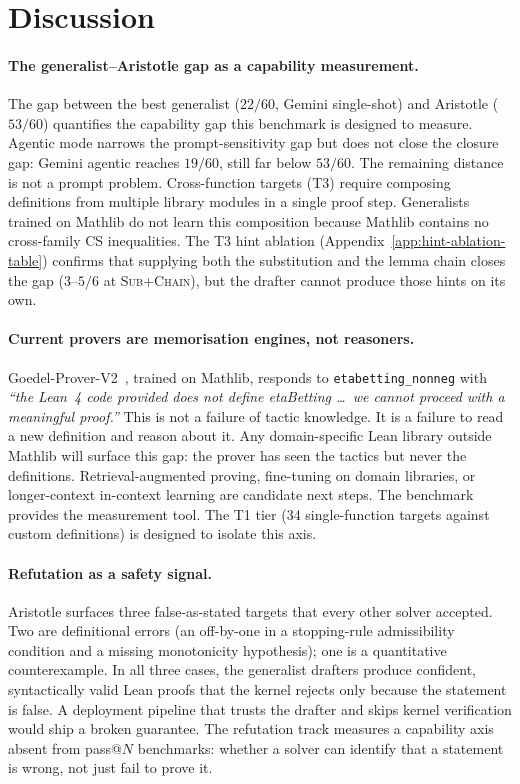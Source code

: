 \section{Discussion}
\label{sec:discussion}

\paragraph{The generalist--Aristotle gap as a capability measurement.}
The gap between the best generalist ($22/60$, Gemini single-shot)
and Aristotle ($53/60$) quantifies the capability gap this benchmark
is designed to measure. Agentic mode narrows the prompt-sensitivity gap but does
not close the closure gap: Gemini agentic reaches $19/60$, still
far below $53/60$. The remaining distance is not a prompt problem.
Cross-function targets (T3) require composing definitions from
multiple library modules in a single proof step. Generalists
trained on Mathlib do not learn this composition because Mathlib
contains no cross-family CS inequalities. The T3 hint ablation
(Appendix~\ref{app:hint-ablation-table}) confirms that supplying
both the substitution and the lemma chain closes the gap
($3$--$5/6$ at \textsc{Sub+Chain}), but the drafter cannot
produce those hints on its own.

\paragraph{Current provers are memorisation engines, not reasoners.}
Goedel-Prover-V2~\cite{goedelprover2025}, trained on Mathlib,
responds to \texttt{etabetting\_nonneg} with \emph{``the Lean~4
code provided does not define etaBetting \ldots\ we cannot proceed
with a meaningful proof.''} This is not a failure of tactic
knowledge. It is a failure to read a new definition and reason
about it. Any domain-specific Lean library outside Mathlib will
surface this gap: the prover has seen the tactics but never the
definitions. Retrieval-augmented proving, fine-tuning on
domain libraries, or longer-context in-context learning are
candidate next steps. The benchmark provides the measurement
tool. The T1 tier ($34$ single-function targets against custom
definitions) is designed to isolate this axis.

\paragraph{Refutation as a safety signal.}
Aristotle surfaces three false-as-stated targets that every other
solver accepted. Two are definitional errors (an off-by-one in a
stopping-rule admissibility condition and a missing monotonicity
hypothesis); one is a quantitative counterexample. In all three
cases, the generalist drafters produce confident, syntactically
valid Lean proofs that the kernel rejects only because the
statement is false. A deployment pipeline that trusts the drafter
and skips kernel verification would ship a broken guarantee. The
refutation track measures a capability axis absent from pass@$N$
benchmarks: whether a solver can identify that a statement is
wrong, not just fail to prove it.

